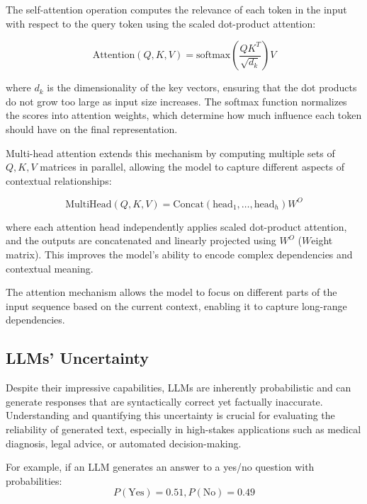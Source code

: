 The self-attention operation computes the relevance of each token in the input
with respect to the query token using the scaled dot-product attention:

\begin{displaymath}
  \mbox{Attention}(Q, K, V) = \mbox{softmax}\left(\frac{QK^{T}}{\sqrt{d_{k}}}\right
  ) V
\end{displaymath}

where $d_{k}$ is the dimensionality of the key vectors, ensuring that the dot
products do not grow too large as input size increases. The softmax function normalizes
the scores into attention weights, which determine how much influence each token
should have on the final representation.

Multi-head attention extends this mechanism by computing multiple sets of
$Q,K,V$ matrices in parallel, allowing the model to capture different aspects of
contextual relationships:

\begin{displaymath}
  \mbox{MultiHead}(Q, K, V) = \mbox{Concat}(\mbox{head}_{1}, \dots, \mbox{head}_{h}
  ) W^{O}
\end{displaymath}

where each attention head independently applies scaled dot-product attention, and
the outputs are concatenated and linearly projected using $W^{O}$ ($W$eight matrix).
This improves the model's ability to encode complex dependencies and contextual meaning.

The attention mechanism allows the model to focus on different parts of the input
sequence based on the current context, enabling it to capture long-range
dependencies.

\subsection{LLMs' Uncertainty}
\label{sub:llms_uncertainty}

Despite their impressive capabilities, LLMs are inherently probabilistic and can
generate responses that are syntactically correct yet factually inaccurate. Understanding
and quantifying this uncertainty is crucial for evaluating the reliability of generated
text, especially in high-stakes applications such as medical diagnosis, legal advice,
or automated decision-making.

For example, if an LLM generates an answer to a yes/no question with probabilities:
\begin{displaymath}
  P(\mbox{Yes})=0.51,P(\mbox{No})=0.49
\end{displaymath}

